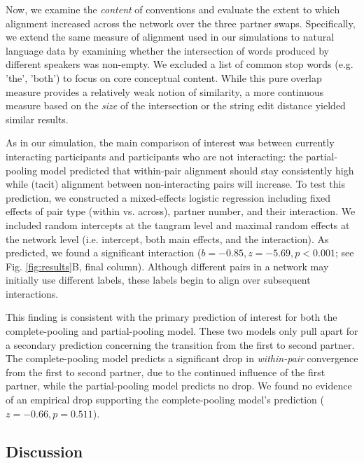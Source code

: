Now, we examine the \emph{content} of conventions and evaluate the extent to which alignment increased across the network over the three partner swaps. 
Specifically, we extend the same measure of alignment used in our simulations to natural language data by examining whether the intersection of words produced by different speakers was non-empty.
We excluded a list of common stop words (e.g. 'the', 'both') to focus on core conceptual content.
While this pure overlap measure provides a relatively weak notion of similarity, a more continuous measure based on the \emph{size} of the intersection or the string edit distance yielded similar results.

As in our simulation, the main comparison of interest was between currently interacting participants and participants who are not interacting: the partial-pooling model predicted that within-pair alignment should stay consistently high while (tacit) alignment between non-interacting pairs will increase. 
To test this prediction, we constructed a mixed-effects logistic regression including fixed effects of pair type (within vs. across), partner number, and their interaction.
We included random intercepts at the tangram level and maximal random effects at the network level (i.e. intercept, both main effects, and the interaction).
As predicted, we found a significant interaction ($b = -0.85, z = -5.69, p < 0.001$; see Fig. \ref{fig:results}B, final column).
Although different pairs in a network may initially use different labels, these labels begin to align over subsequent interactions. 

This finding is consistent with the primary prediction of interest for both the complete-pooling and partial-pooling model. %
These two models only pull apart for a secondary prediction concerning the transition from the first to second partner.
The complete-pooling model predicts a significant drop in \emph{within-pair} convergence from the first to second partner, due to the continued influence of the first partner, while the partial-pooling model predicts no drop. 
We found no evidence of an empirical drop supporting the complete-pooling model's prediction ($z=-0.66, p = 0.511$). 

\subsection{Discussion}

